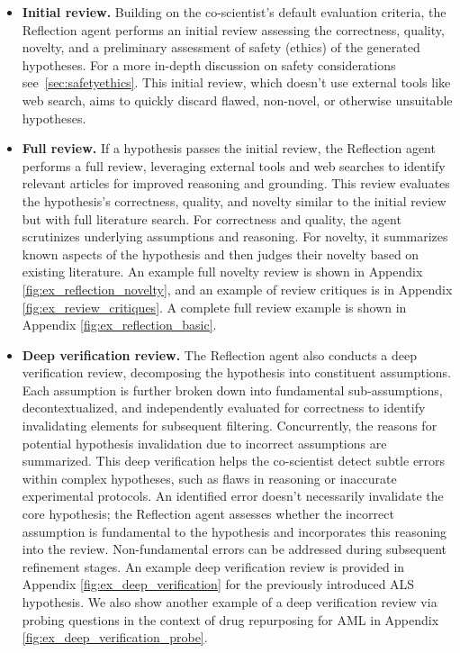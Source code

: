 \begin{itemize}
    \item \textbf{Initial review.} Building on the co-scientist's default evaluation criteria, the Reflection agent performs an initial review assessing the correctness, quality, novelty, and a preliminary assessment of safety (ethics) of the generated hypotheses. For a more in-depth discussion on safety considerations see~\cref{sec:safetyethics}. This initial review, which doesn't use external tools like web search, aims to quickly discard flawed, non-novel, or otherwise unsuitable hypotheses.
    \item \textbf{Full review.}  If a hypothesis passes the initial review, the Reflection agent performs a full review, leveraging external tools and web searches to identify relevant articles for improved reasoning and grounding. This review evaluates the hypothesis's correctness, quality, and novelty similar to the initial review but with full literature search. For correctness and quality, the agent scrutinizes underlying assumptions and reasoning. For novelty, it summarizes known aspects of the hypothesis and then judges their novelty based on existing literature. An example full novelty review is shown in Appendix \cref{fig:ex_reflection_novelty}, and an example of review critiques is in Appendix \cref{fig:ex_review_critiques}. A complete full review example is shown in Appendix \cref{fig:ex_reflection_basic}.
    \item \textbf{Deep verification review.} The Reflection agent also conducts a deep verification review, decomposing the hypothesis into constituent assumptions. Each assumption is further broken down into fundamental sub-assumptions, decontextualized, and independently evaluated for correctness to identify invalidating elements for subsequent filtering. Concurrently, the reasons for potential hypothesis invalidation due to incorrect assumptions are summarized. This deep verification helps the co-scientist detect subtle errors within complex hypotheses, such as flaws in reasoning or inaccurate experimental protocols.  An identified error doesn't necessarily invalidate the core hypothesis; the Reflection agent assesses whether the incorrect assumption is fundamental to the hypothesis and incorporates this reasoning into the review. Non-fundamental errors can be addressed during subsequent refinement stages.  An example deep verification review is provided in Appendix \cref{fig:ex_deep_verification} for the previously introduced ALS hypothesis. We also show another example of a deep verification review via probing questions in the context of drug repurposing for AML in Appendix \cref{fig:ex_deep_verification_probe}.

\end{itemize}
